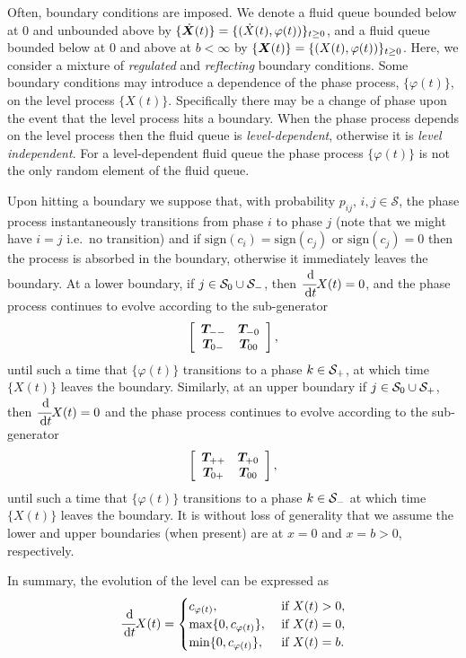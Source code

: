 Often, boundary conditions are imposed. We denote a fluid queue bounded below at \(0\) and unbounded above by \(\{\dot{\boldsymbol X}(t)\} = \{(\dot X(t),\varphi(t))\}_{t\geq0}\), and a fluid queue bounded below at \(0\) and above at \(b<\infty\) by \(\{{\boldsymbol X}(t)\} = \{( X(t),\varphi(t))\}_{t\geq0}\). Here, we consider a mixture of \emph{regulated} and \emph{reflecting} boundary conditions. Some boundary conditions may introduce a dependence of the phase process, \(\{\varphi(t)\}\), on the level process \(\{X(t)\}\). Specifically there may be a change of phase upon the event that the level process hits a boundary. When the phase process depends on the level process then the fluid queue is \emph{level-dependent}, otherwise it is \emph{level independent}. For a level-dependent fluid queue the phase process \(\{\varphi(t)\}\) is not the only random element of the fluid queue.

Upon hitting a boundary we suppose that, with probability \(p_{ij},\,i,j\in\mathcal S\), the phase process instantaneously transitions from phase \(i\) to phase \(j\) (note that we might have \(i=j\) i.e.~no transition) and if \(\mathrm{sign}(c_i)=\mathrm{sign}(c_j)\) or \(\mathrm{sign}(c_j)=0\) then the process is absorbed in the boundary, otherwise it immediately leaves the boundary. At a lower boundary, if \(j\in\mathcal{S}_0\cup\mathcal{S}_-\), then \(\cfrac{\, \mathrm{d}}{\, \mathrm{d} t} X(t) = 0\), and the phase process continues to evolve according to the sub-generator 
\[\left[\begin{array}{cc} \boldsymbol T_{--} & \boldsymbol T_{-0} \\ \boldsymbol T_{0-} & \boldsymbol T_{00}  \end{array}\right],\]
until such a time that \(\{\varphi(t)\}\) transitions to a phase \(k\in\mathcal{S}_+\), at which time \(\{X(t)\}\) leaves the boundary. Similarly, at an upper boundary if \(j\in\mathcal{S}_0\cup\mathcal{S}_+\), then \(\cfrac{\, \mathrm{d}}{\, \mathrm{d} t} X(t) = 0\) and the phase process continues to evolve according to the sub-generator 
\[\left[\begin{array}{cc} \boldsymbol T_{++} & \boldsymbol T_{+0} \\ \boldsymbol T_{0+} & \boldsymbol T_{00}  \end{array}\right],\]
until such a time that \(\{\varphi(t)\}\) transitions to a phase \(k\in\mathcal{S}_-\) at which time \(\{X(t)\}\) leaves the boundary. It is without loss of generality that we assume the lower and upper boundaries (when present) are at \(x=0\) and \(x=b>0\), respectively.

In summary, the evolution of the level can be expressed as 
\[\cfrac{\, \mathrm{d}}{\, \mathrm{d} t} X(t) = \begin{cases} c_{\varphi(t)}, & \mbox{ if } X(t)>0, \\ \max\{0,c_{\varphi(t)}\}, & \mbox{ if } X(t)=0, \\ \min\{0,c_{\varphi(t)}\}, & \mbox{ if } X(t)=b.  \end{cases}\]

